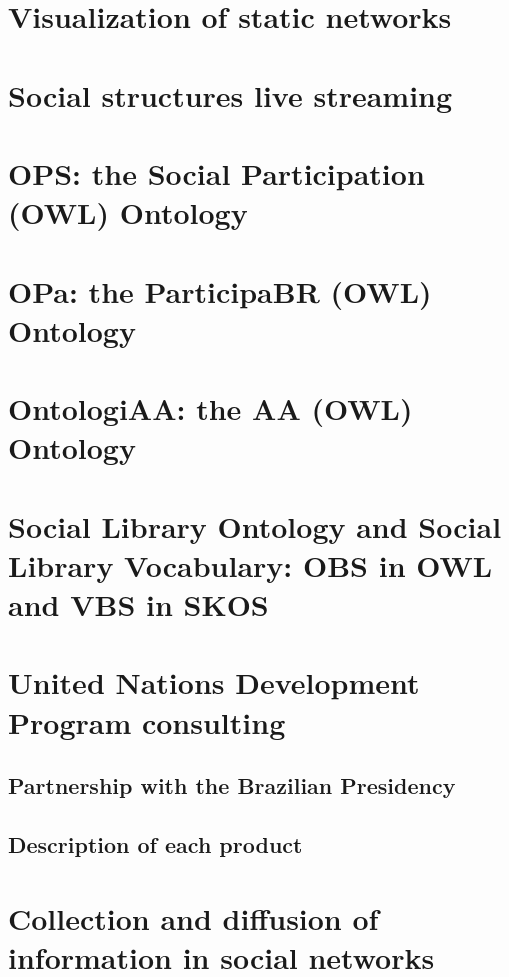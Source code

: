 \begin{apendicesenv}
\section{Visualization of static networks}
\section{Social structures live streaming}
\section{OPS: the Social Participation (OWL) Ontology}
\section{OPa: the ParticipaBR (OWL) Ontology}
\section{OntologiAA: the AA (OWL) Ontology}
\section{Social Library Ontology and Social Library Vocabulary: OBS in OWL and VBS in SKOS}
\section{United Nations Development Program consulting}
\subsection{Partnership with the Brazilian Presidency}
\subsection{Description of each product}
\section{Collection and diffusion of information in social networks}

\end{apendicesenv}

